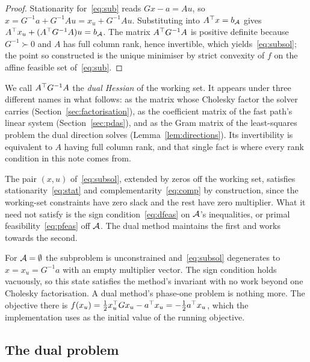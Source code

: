 \begin{proof}
Stationarity for~\eqref{eq:sub} reads $Gx - a = Au$, so
$x = G^{-1}a + G^{-1}Au = x_u + G^{-1}Au$. Substituting into $A^{\top} x = b_{\mathcal{A}}$
gives $A^{\top} x_u + (A^{\top} G^{-1}A)u = b_{\mathcal{A}}$. The matrix $A^{\top} G^{-1}A$ is
positive definite because $G^{-1} \succ 0$ and $A$ has full column rank, hence
invertible, which yields~\eqref{eq:subsol}; the point so constructed is the unique
minimiser by strict convexity of $f$ on the affine
feasible set of~\eqref{eq:sub}.
\end{proof}

We call $A^{\top} G^{-1} A$ the \emph{dual Hessian} of the working set. It appears
under three different names in what follows: as the matrix whose Cholesky factor
the solver carries (Section~\ref{sec:factorisation}), as the coefficient matrix of
the fast path's linear system (Section~\ref{sec:pdas}), and as the Gram matrix of
the least-squares problem the dual direction solves
(Lemma~\ref{lem:directions}). Its invertibility is equivalent to $A$
having full column rank, and that single fact is where every rank condition in
this note comes from.

The pair $(x,u)$ of~\eqref{eq:subsol}, extended by zeros off the working set,
satisfies stationarity~\eqref{eq:stat} and complementarity~\eqref{eq:comp} by
construction, since the working-set constraints have zero slack and the rest have
zero multiplier. What it need not satisfy is the sign
condition~\eqref{eq:dfeas} on $\mathcal{A}$'s inequalities, or primal
feasibility~\eqref{eq:pfeas} off $\mathcal{A}$. The dual method maintains the first
and works towards the second.

\begin{remark}\label{rem:cold}
For $\mathcal{A} = \emptyset$ the subproblem is unconstrained and~\eqref{eq:subsol}
degenerates to $x = x_u = G^{-1}a$ with an empty multiplier vector. The sign
condition holds vacuously, so this state satisfies the method's invariant with no
work beyond one Cholesky factorisation. A dual method's phase-one problem is
nothing more. The objective there is
$f(x_u) = \tfrac12 x_u^{\top} G x_u - a^{\top} x_u = -\tfrac12 a^{\top} x_u$, which the
implementation uses as the initial value of the running objective.
\end{remark}

\subsection{The dual problem}

